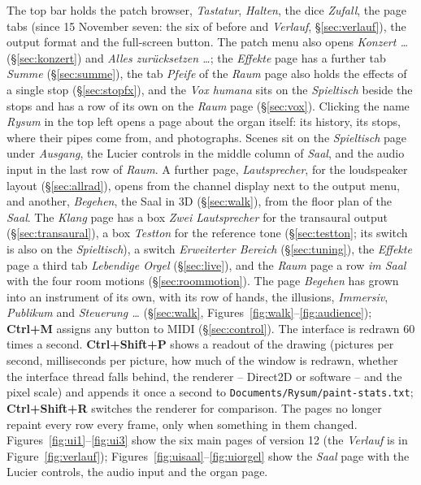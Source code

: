 \documentclass[11pt,a4paper,parskip=half,DIV=11,toc=bibliography]{scrartcl}
\newcommand{\ui}[1]{\emph{#1}}                 %
\newcommand{\fn}[1]{\mbox{\texttt{#1}}}
\begin{document}
The top bar holds the patch browser, \ui{Tastatur}, \ui{Halten}, the dice \ui{Zufall}, the page tabs (since 15 November seven: the six of before and
\ui{Verlauf}, \S\ref{sec:verlauf}), the output format and the full-screen button. The patch menu also opens \ui{Konzert \dots} (\S\ref{sec:konzert}) and
\ui{Alles zurücksetzen \dots}; the \ui{Effekte} page has a further tab \ui{Summe} (\S\ref{sec:summe}), the tab \ui{Pfeife} of the \ui{Raum} page also holds
the effects of a single stop (\S\ref{sec:stopfx}), and the \ui{Vox humana} sits on the \ui{Spieltisch} beside the stops and has a row of its own on the
\ui{Raum} page (\S\ref{sec:vox}). Clicking the name \ui{Rysum} in the top left opens a page about the organ itself: its history, its stops, where their pipes come from, and photographs. Scenes sit on the \ui{Spieltisch} page under \ui{Ausgang}, the Lucier controls in the middle column of \ui{Saal}, and the audio input in the last row of \ui{Raum}. A further page, \ui{Lautsprecher}, for the loudspeaker layout (\S\ref{sec:allrad}), opens from the channel display next to the output menu,
and another, \ui{Begehen}, the Saal in 3D (\S\ref{sec:walk}), from the floor plan of the \ui{Saal}. The \ui{Klang} page has a box \ui{Zwei Lautsprecher}
for the transaural output (\S\ref{sec:transaural}), a box \ui{Testton} for the reference tone (\S\ref{sec:testton}; its switch is also on the \ui{Spieltisch}), a switch \ui{Erweiterter Bereich} (\S\ref{sec:tuning}), the \ui{Effekte} page a third tab \ui{Lebendige Orgel} (\S\ref{sec:live}), and the \ui{Raum} page a
row \ui{im Saal} with the four room motions (\S\ref{sec:roommotion}). The page \ui{Begehen} has grown into an instrument of its own, with its
row of hands, the illusions, \ui{Immersiv}, \ui{Publikum} and \ui{Steuerung \dots} (\S\ref{sec:walk}, Figures~\ref{fig:walk}--\ref{fig:audience}); \textbf{Ctrl+M}
assigns any button to MIDI (\S\ref{sec:control}). The interface is redrawn 60 times a second.
\textbf{Ctrl+Shift+P} shows a readout of the drawing (pictures per second, milliseconds per picture, how much of the window is redrawn, whether the
interface thread falls behind, the renderer -- Direct2D or software -- and the pixel scale) and appends it once a second to
\fn{Documents/Rysum/paint-stats.txt}; \textbf{Ctrl+Shift+R} switches the renderer for comparison. The pages no longer repaint every row every frame, only
when something in them changed. Figures~\ref{fig:ui1}--\ref{fig:ui3} show the six main pages of version 12 (the \ui{Verlauf} is in Figure~\ref{fig:verlauf}); Figures~\ref{fig:uisaal}--\ref{fig:uiorgel} show the \ui{Saal} page with the Lucier controls, the audio input and the organ page.
\end{document}
